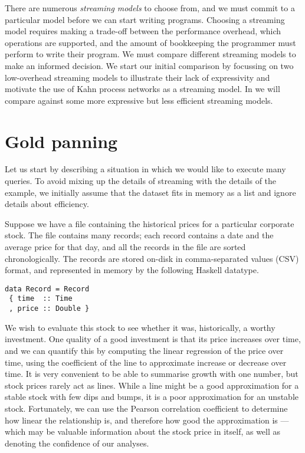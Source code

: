 There are numerous \emph{streaming models} to choose from, and we must commit to a particular model before we can start writing programs.
Choosing a streaming model requires making a trade-off between the performance overhead, which operations are supported, and the amount of bookkeeping the programmer must perform to write their program.
We must compare different streaming models to make an informed decision.
We start our initial comparison by focussing on two low-overhead streaming models to illustrate their lack of expressivity and motivate the use of Kahn process networks as a streaming model.
In  we will compare against some more expressive but less efficient streaming models.

\section{Gold panning}
\label{taxonomy/gold-panning}
Let us start by describing a situation in which we would like to execute many queries.
To avoid mixing up the details of streaming with the details of the example, we initially assume that the dataset fits in memory as a list and ignore details about efficiency.

Suppose we have a file containing the historical prices for a particular corporate stock.
The file contains many records; each record contains a date and the average price for that day, and all the records in the file are sorted chronologically.
The records are stored on-disk in comma-separated values (CSV) format, and represented in memory by the following Haskell datatype.

\begin{lstlisting}
data Record = Record
 { time  :: Time
 , price :: Double }
\end{lstlisting}

We wish to evaluate this stock to see whether it was, historically, a worthy investment.
One quality of a good investment is that its price increases over time, and we can quantify this by computing the linear regression of the price over time, using the coefficient of the line to approximate increase or decrease over time.
It is very convenient to be able to summarise growth with one number, but stock prices rarely act as lines.
While a line might be a good approximation for a stable stock with few dips and bumps, it is a poor approximation for an unstable stock.
Fortunately, we can use the Pearson correlation coefficient to determine how linear the relationship is, and therefore how good the approximation is --- which may be valuable information about the stock price in itself, as well as denoting the confidence of our analyses.

